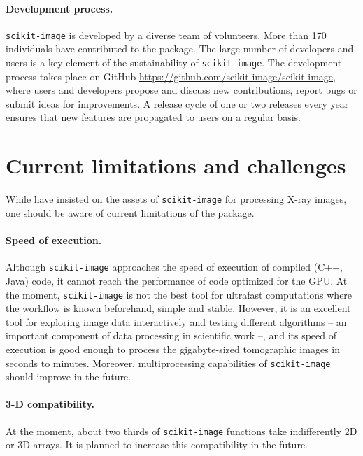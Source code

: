 \documentclass[twocolumn]{bmcart}%
\begin{document}
\paragraph{Development process.}

\texttt{scikit-image} is developed by a diverse team of volunteers.
More than 170 individuals have contributed to the package. The large
number of developers and users is a key element of the sustainability of
\texttt{scikit-image}. The
development process takes place on GitHub
\url{https://github.com/scikit-image/scikit-image}, where users and
developers propose and discuss new contributions, report bugs or submit ideas
for improvements.
A release cycle of one or two releases every year
ensures that new features are propagated to users on a regular basis.

\section*{Current limitations and challenges}

While have insisted on the assets of \texttt{scikit-image} for processing
X-ray images, one should be aware of current limitations of the package.

\paragraph{Speed of execution.} Although \texttt{scikit-image} approaches
the speed of execution of compiled (C++, Java) code, it cannot reach the
performance of code optimized for the GPU. At the moment,
\texttt{scikit-image} is not the best tool for ultrafast computations
where the workflow is known beforehand, simple and stable. However, it is
an excellent tool for exploring image data interactively and testing
different algorithms -- an important component of data processing in
scientific work --, and its speed of execution is good enough to process
the gigabyte-sized tomographic images in seconds to minutes. Moreover,
multiprocessing capabilities of \texttt{scikit-image} should improve in
the future.

\paragraph{3-D compatibility.} At the moment, about two thirds of
\texttt{scikit-image} functions take indifferently 2D or 3D arrays. It is
planned to increase this compatibility in the future.
\end{document}
